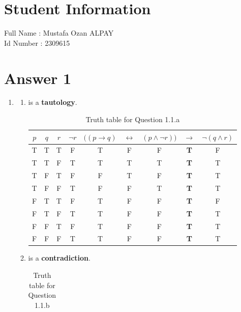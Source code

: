 \documentclass[12pt]{article}
\begin{document}
\section*{Student Information } 
Full Name : Mustafa Ozan ALPAY \\
Id Number : 2309615 \\

\section*{Answer 1}
\begin{enumerate}
	\item 
	\begin{enumerate}
	\item is a \textbf{tautology}. 
	\begin{table}[H]
	\small
    \centering
    \caption{ Truth table for Question 1.1.a }
    \begin{tabular}{|c|c|c|c|ccccc|}	
    \hline 							
    \textbf{$p$} & \textbf{$q$} & \textbf{$r$} & \textbf{$\neg r$} &  \textbf{$((p\rightarrow q)$} & \textbf{$\leftrightarrow$} & \textbf{$(p\land\neg r))$} & \textbf{$\rightarrow$} & \textbf{$\neg(q\land r)$}  \\
    \hline 
    \hline 
    T & T & T & F & T & F & F & \textbf{T} & F \\ \hline
    T & T & F & T & T & T & T & \textbf{T} & T \\ \hline
    T & F & T & F & F & T & F & \textbf{T} & T \\ \hline
    T & F & F & T & F & F & T & \textbf{T} & T \\ \hline
    F & T & T & F & T & F & F & \textbf{T} & F \\ \hline
    F & T & F & T & T & F & F & \textbf{T} & T \\ \hline
    F & F & T & F & T & F & F & \textbf{T} & T \\ \hline
    F & F & F & T & T & F & F & \textbf{T} & T \\ \hline
    \end{tabular}
    \end{table}
	\item is a  \textbf{contradiction}.
	\begin{table}[H]
	\small
    \centering
    \caption{ Truth table for Question 1.1.b }
    \begin{tabular}{|c|c|c|cccccc|}	

\end{tabular}
\end{table}
\end{enumerate}
\end{enumerate}
\end{document}
